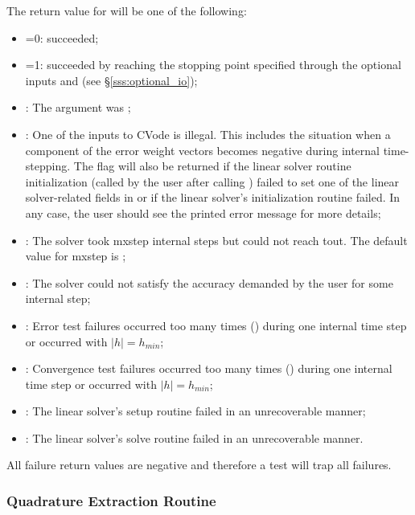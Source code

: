 The return value  for  will be one of the following:
\begin{itemize}
\item {}=0:
   succeeded;
\item {}=1:
   succeeded by reaching the stopping point specified through
  the optional inputs  and  
  (see \S\ref{sss:optional_io});
\item {}:
  The  argument was ;
\item {}:
  One of the inputs to CVode is illegal. This includes the situation when a 
  component of the error weight vectors becomes negative during internal 
  time-stepping. The  flag will also be returned if the linear 
  solver routine initialization (called by the user after calling 
  ) failed to set one of the linear solver-related fields 
  in  or if the linear solver's initialization routine failed. 
  In any case, the user should see the printed error message for more details;
\item {}: 
  The solver took mxstep internal steps but could not reach tout. 
  The default value for mxstep is ;      
\item {}: 
  The solver could not satisfy the accuracy demanded by the user for some 
  internal step;
\item {}: 
  Error test failures occurred too many times () during one 
  internal time step or occurred with $|h| = h_{min}$;
\item {}: 
  Convergence test failures occurred too many times () during 
  one internal time step or occurred with $|h| = h_{min}$;             
\item {}: 
  The linear solver's setup routine failed in an unrecoverable manner;
\item {}: 
  The linear solver's solve routine failed in an unrecoverable manner.
\end{itemize} 
All failure return values are negative and therefore a test 
will trap all  failures.

\subsubsection{Quadrature Extraction Routine}\label{sss:cvodequadextract}

